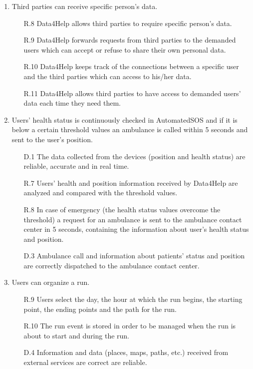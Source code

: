 \documentclass[a4paper]{article}
\begin{document}
\begin{enumerate}[label*=\bf{G.\arabic*}]
        
        \item Third parties can receive specific person's data.
                
        \begin{enumerate}
                \item[R.8] Data4Help allows third parties to require specific person's data. 
                \item [R.9] Data4Help forwards requests from third parties to the demanded users which can accept or refuse to share their own personal data.
                \item [R.10] Data4Help keeps track of the connections between a specific user and the third parties which can access to his/her data.
                \item [R.11] Data4Help allows third parties to have access to demanded users' data each time they need them.
            \end{enumerate}
                
            
        \item Users' health status is continuously checked in AutomatedSOS and if it is below a certain threshold values an ambulance is called within 5 seconds and sent to the user's position.
    
        \begin{enumerate}
            \item [D.1] The data collected from the devices (position and health status) are reliable, accurate and in real time.
            \item [R.7] Users' health and position information received by Data4Help are analyzed and compared with the threshold values.
            \item [R.8] In case of emergency (the health status values overcome the threshold) a request for an ambulance is sent to the ambulance contact center in 5 seconds, containing the information about user's health status and position.
            \item [D.3] Ambulance call and information about patients' status and position are correctly dispatched to the ambulance contact center.
        \end{enumerate}
        
        \item Users can organize a run.
        
        \begin{enumerate}
            \item [R.9] Users select the day, the hour at which the run begins, the starting point, the ending points and the path for the run.
            \item [R.10] The run event is stored in order to be managed when the run is about to start and during the run.
            \item [D.4] Information and data (places, maps, paths, etc.) received from external services are correct are reliable.
        \end{enumerate}
        

\end{enumerate}
\end{document}
